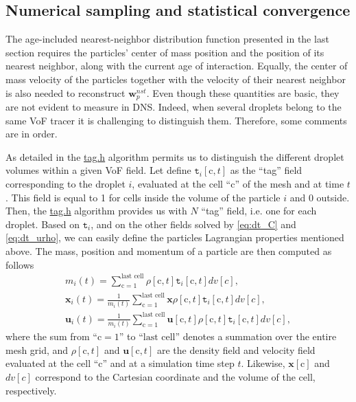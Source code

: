 \subsection{Numerical sampling and statistical convergence}

The age-included nearest-neighbor distribution function presented in the last section requires the particles' center of mass position and the position of its nearest neighbor, along with the current age of interaction.
Equally, the center of mass velocity of the particles together with the velocity of their nearest neighbor is also needed to reconstruct $\textbf{w}_p^{nst}$. 
Even though these quantities are basic, they are not evident to measure in DNS.
Indeed, when several droplets belong to the same VoF tracer it is challenging to distinguish them.
Therefore, some comments are in order.   

As detailed in \citet{fintzi2024buoyancy} the \href{http://basilisk.fr/src/tag.h}{tag.h} algorithm permits us to distinguish the different droplet volumes within a given VoF field. 
Let define $\texttt{t}_i[\text{c},t]$ as the ``tag'' field corresponding to the droplet $i$, evaluated at the cell ``c'' of the mesh and at time $t$.
This field is equal to 1 for cells inside the volume of the particle $i$ and 0 outside.
Then, the \href{http://basilisk.fr/src/tag.h}{tag.h} algorithm provides us with $N$ ``tag'' field, i.e. one for each droplet. 
Based on $\texttt{t}_i$, and on the other fields solved by \ref{eq:dt_C} and \ref{eq:dt_urho}, we can easily define the particles Lagrangian properties mentioned above. 
The mass, position and momentum of a particle are then computed as follows 
\begin{align*}
    m_i(t)
    = \sum_{\text{c} = 1}^\text{last cell}
    \rho [\text{c},t]
    \texttt{t}_i[\text{c},t]dv[c],
    \\ 
    \textbf{x}_i(t)
    = 
    \frac{1}{m_i(t)}
    \sum_{\text{c} = 1}^\text{last cell}
    \textbf{x} 
    \rho [\text{c},t]
    \texttt{t}_i[\text{c},t]dv[c],
    \\ 
    \textbf{u}_i(t)
    = 
    \frac{1}{m_i(t)}
    \sum_{\text{c} = 1}^\text{last cell}
    \textbf{u} [\text{c},t]
    \rho [\text{c},t]
    \texttt{t}_i[\text{c},t]dv[c],
\end{align*}
where the sum from ``$\text{c} = 1$'' to ``$\text{last cell}$'' denotes a summation over the entire mesh grid, and $\rho[\text{c},t]$ and $\textbf{u}[\text{c},t]$ are the density field and velocity field evaluated at the cell ``c'' and at a simulation time step $t$. 
Likewise, $\textbf{x}[\text{c}]$ and $dv[c]$ correspond to the Cartesian coordinate and the volume of the cell, respectively. 

